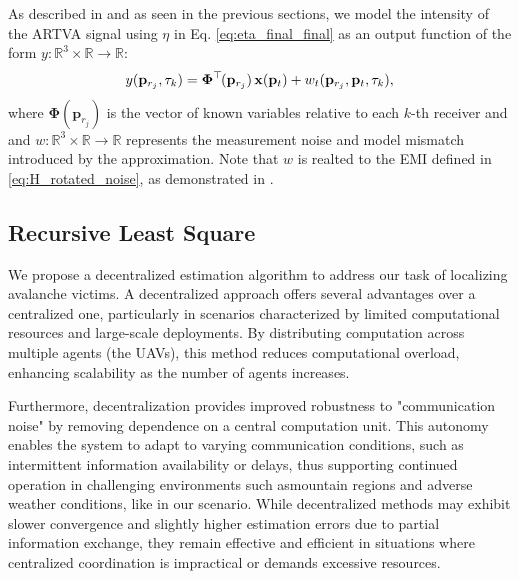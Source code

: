 \noindent
As described in \cite{similar-main} and as seen in the previous sections, 
we model the intensity of the ARTVA signal using $\eta$ in Eq. \ref{eq:eta_final_final} 
as an output function of the form \( y : \mathbb{R}^3 \times \mathbb{R} \rightarrow \mathbb{R} \):
\[
y(\mathbf{p}_{r_j}, \tau_k) = \mathbf{\Phi}^\top\mkern-2mu(\mathbf{p}_{r_j}) \, \mathbf{x}(\mathbf{p}_t) + 
w_t(\mathbf{p}_{r_j}, \mathbf{p}_t, \tau_k),
\]
where $\mathbf{\Phi}(\mathbf{p}_{r_j})$ is the vector of known variables
relative to each $k$-th receiver and 
and \( w : \mathbb{R}^3 \times \mathbb{R} \rightarrow \mathbb{R} \) 
represents the measurement noise and model 
mismatch introduced by the approximation.
Note that $w$ is realted to the EMI defined in \ref{eq:H_rotated_noise}, as demonstrated in \cite{similar-main}.

\subsection{Recursive Least Square}
We propose a decentralized estimation algorithm to address our task of localizing avalanche 
victims. A decentralized approach offers several advantages over a centralized one, particularly 
in scenarios characterized by limited computational resources and large-scale deployments. 
By distributing computation across multiple agents (the UAVs), this method reduces computational 
overload, enhancing scalability as the number of agents increases.

Furthermore, decentralization provides improved robustness to "communication noise" by removing 
dependence on a central computation unit. This autonomy enables the system to adapt to varying 
communication conditions, such as intermittent information availability or delays, thus supporting 
continued operation in challenging environments such asmountain regions and adverse weather 
conditions, like in our scenario. While decentralized methods may exhibit slower convergence and slightly higher estimation 
errors due to partial information exchange, they remain effective and efficient in situations where 
centralized coordination is impractical or demands excessive resources.

